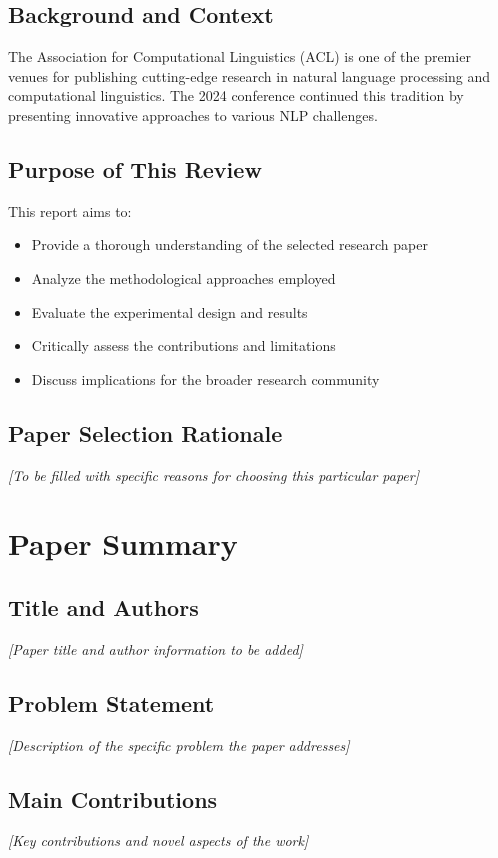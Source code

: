 \documentclass[12pt,a4paper]{article}
\begin{document}
\subsection{Background and Context}
The Association for Computational Linguistics (ACL) is one of the premier venues for publishing cutting-edge research in natural language processing and computational linguistics. The 2024 conference continued this tradition by presenting innovative approaches to various NLP challenges.

\subsection{Purpose of This Review}
This report aims to:
\begin{itemize}
    \item Provide a thorough understanding of the selected research paper
    \item Analyze the methodological approaches employed
    \item Evaluate the experimental design and results
    \item Critically assess the contributions and limitations
    \item Discuss implications for the broader research community
\end{itemize}

\subsection{Paper Selection Rationale}
\textit{[To be filled with specific reasons for choosing this particular paper]}

\section{Paper Summary}

\subsection{Title and Authors}
\textit{[Paper title and author information to be added]}

\subsection{Problem Statement}
\textit{[Description of the specific problem the paper addresses]}

\subsection{Main Contributions}
\textit{[Key contributions and novel aspects of the work]}
\end{document}
